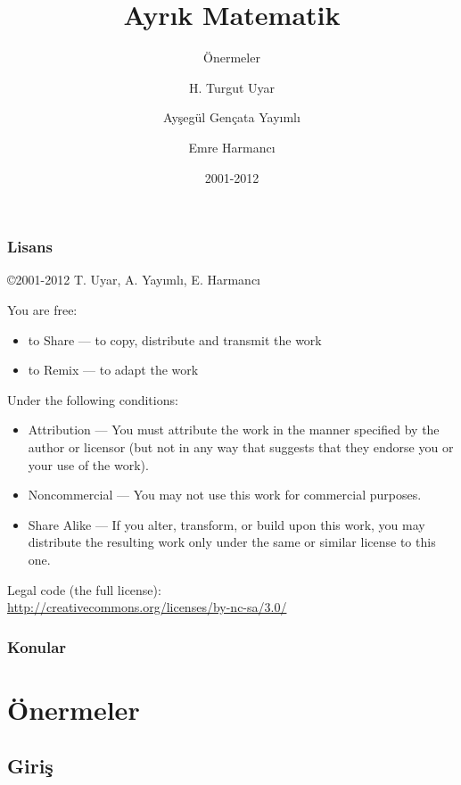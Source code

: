 \documentclass[dvipsnames]{beamer}
\title{Ayrık Matematik}
\subtitle{Önermeler}
\author{H. Turgut Uyar \and Ayşegül Gençata Yayımlı \and Emre Harmancı}
\date{2001-2012}
\theoremstyle{definition}
\theoremstyle{example}
\theoremstyle{plain}
\begin{document}
\begin{frame}
  \titlepage
\end{frame}

\begin{frame}
  \frametitle{Lisans}

  \hfill
  \copyright 2001-2012 T. Uyar, A. Yayımlı, E. Harmancı

  \vfill
  \begin{tiny}
    You are free:
    \begin{itemize}
      \item to Share — to copy, distribute and transmit the work
      \item to Remix — to adapt the work
    \end{itemize}

    Under the following conditions:
    \begin{itemize}
      \item Attribution — You must attribute the work in the manner specified by
        the author or licensor (but not in any way that suggests that they
        endorse you or your use of the work).

      \item Noncommercial — You may not use this work for commercial purposes.

      \item Share Alike — If you alter, transform, or build upon this work, you
        may distribute the resulting work only under the same or similar license
        to this one.
    \end{itemize}
  \end{tiny}

  \vfill
  Legal code (the full license):\\
  \url{http://creativecommons.org/licenses/by-nc-sa/3.0/}
\end{frame}

\begin{frame}
  \frametitle{Konular}
  \tableofcontents
\end{frame}

\section{Önermeler}

\subsection{Giriş}
\end{document}
